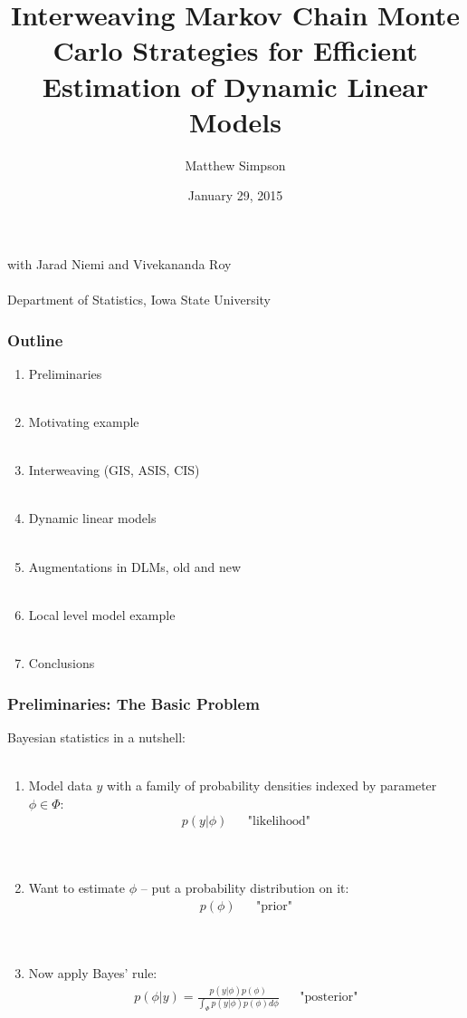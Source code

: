 \documentclass[xcolor=dvipsnames]{beamer}
\title[Interweaving MCMC Strats for DLMs]{Interweaving Markov Chain Monte Carlo Strategies for Efficient
Estimation of Dynamic Linear Models}
\author[Matt Simpson]{Matthew Simpson}
\date{January 29, 2015}
\institute[]{Departments of Statistics and Economics, Iowa State University}
\begin{document}
\begin{frame}
\titlepage
\begin{center}
with Jarad Niemi and Vivekananda Roy\\~\\
\scriptsize{Department of Statistics, Iowa State University}
\end{center}
\end{frame}

\begin{frame}
\frametitle{Outline}
\begin{enumerate}
\item Preliminaries\\~\\
\item Motivating example\\~\\
\item Interweaving (GIS, ASIS, CIS)\\~\\
\item Dynamic linear models\\~\\
\item Augmentations in DLMs, old and new\\~\\
\item Local level model example\\~\\
\item Conclusions
\end{enumerate}
\end{frame}

\begin{frame}
\frametitle{Preliminaries: The Basic Problem}
Bayesian statistics in a nutshell:\\~\\
\begin{enumerate}
\item Model data $y$ with a family of probability densities indexed by parameter $\phi\in\Phi$:
\begin{align*}
p(y|\phi) && \mbox{"likelihood"}
\end{align*}\\~

\pause \item Want to estimate $\phi$ -- put a probability distribution on it:
\begin{align*}
p(\phi) && \mbox{"prior"}
\end{align*}\\~

\pause \item Now apply Bayes' rule:
\begin{align*}
p(\phi|y) = \frac{p(y|\phi)p(\phi)}{\int_{\Phi}p(y|\phi)p(\phi)d\phi} && \mbox{"posterior"}
\end{align*}
\end{enumerate}
\end{frame}
\end{document}
